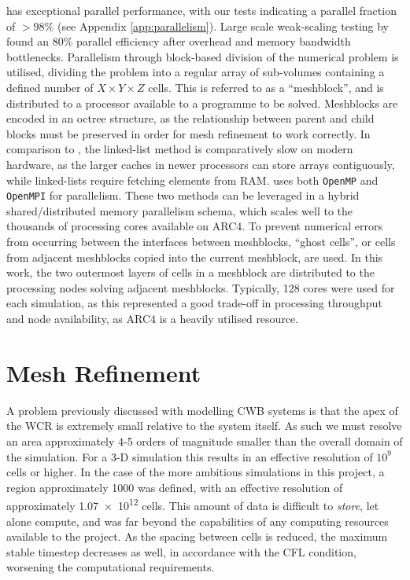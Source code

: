 
\athena{} has exceptional parallel performance, with our tests indicating a parallel fraction of $>98\%$ (see Appendix \ref{app:parallelism}).
Large scale weak-scaling testing by \textcite{stoneAthenaAdaptiveMesh2020} found an 80\% parallel efficiency after overhead and memory bandwidth bottlenecks.
Parallelism through block-based division of the numerical problem is utilised, dividing the problem into a regular array of sub-volumes containing a defined number of $X\times Y \times Z$ cells.
This is referred to as a ``meshblock'', and is distributed to a processor available to a programme to be solved.
Meshblocks are encoded in an octree structure, as the relationship between parent and child blocks must be preserved in order for mesh refinement to work correctly.
In comparison to \mg{}, the linked-list method is comparatively slow on modern hardware, as the larger caches in newer processors can store arrays contiguously, while linked-lists require fetching elements from RAM.
\athena{} uses both \texttt{OpenMP} and \texttt{OpenMPI} for parallelism.
These two methods can be leveraged in a hybrid shared/distributed memory parallelism schema, which scales well to the thousands of processing cores available on ARC4.
To prevent numerical errors from occurring between the interfaces between meshblocks, ``ghost cells'', or cells from adjacent meshblocks copied into the current meshblock, are used.
In this work, the two outermost layers of cells in a meshblock are distributed to the processing nodes solving adjacent meshblocks.
Typically, \num{128} cores were used for each simulation, as this represented a good trade-off in processing throughput and node availability, as ARC4 is a heavily utilised resource.

\section{Mesh Refinement}
\label{sec:refinement}

A problem previously discussed with modelling CWB systems is that the apex of the WCR is extremely small relative to the system itself.
As such we must resolve an area approximately 4-5 orders of magnitude smaller than the overall domain of the simulation.
For a 3-D simulation this results in an effective resolution of $10^9$ cells or higher.
In the case of the more ambitious simulations in this project, a region approximately \SI{1000}{\au} was defined, with an effective resolution of approximately \num{1.07e12} cells.
This amount of data is difficult to \emph{store}, let alone compute, and was far beyond the capabilities of any computing resources available to the project.
As the spacing between cells is reduced, the maximum stable timestep decreases as well, in accordance with the CFL condition, worsening the computational requirements.

